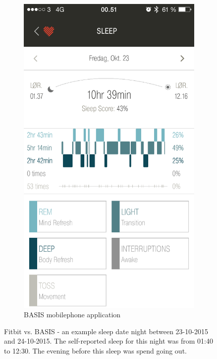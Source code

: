 \documentclass[12pt]{article} %
\begin{document}
\begin{figure}[H]
\begin{subfigure}[b]{0.45\textwidth}
        \includegraphics[width=\textwidth]{img/24-10-basis}
        \caption{BASIS mobilephone application}
        \label{fig:basis0}
    \end{subfigure}
    \caption{Fitbit vs. BASIS - an example sleep date night between 23-10-2015 and 24-10-2015. The self-reported sleep for this night was from 01:40 to 12:30. The evening before this sleep was spend going out.}
    \label{fig:pilot0}
\end{figure}
\end{document}
